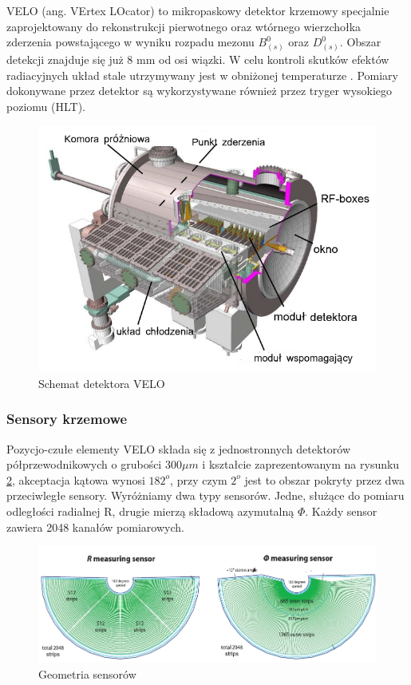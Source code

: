 VELO (ang. VErtex LOcator) to mikropaskowy detektor krzemowy specjalnie zaprojektowany do rekonstrukcji pierwotnego oraz wtórnego wierzchołka zderzenia powstającego w wyniku rozpadu mezonu $B_{(s)}^0$ oraz $D_{(s)}^0$\cite{VELORaport}. Obszar detekcji znajduje się już 8 mm od osi wiązki. W celu kontroli skutków efektów radiacyjnych układ stale utrzymywany jest w obniżonej temperaturze \cite{Papadelis} . Pomiary dokonywane przez detektor są wykorzystywane również przez tryger wysokiego poziomu (HLT). 
\begin{figure}[!ht]
 \centering
 \includegraphics[scale=0.7]{rozdzial2/Velo_jakis.png}
 \caption{Schemat detektora VELO\cite{VELORaport}}
 \label{fig:SchematVELO}
\end{figure}
\subsubsection{Sensory krzemowe }
Pozycjo-czułe elementy VELO składa się z jednostronnych detektorów półprzewodnikowych o grubości 300$\mu m$ i  kształcie zaprezentowanym na rysunku \ref{fig:sensory}, akceptacja kątowa wynosi $182^{o}$, przy czym $2^{o}$ jest to obszar pokryty przez dwa przeciwległe sensory. Wyróżniamy dwa typy sensorów. Jedne, służące do pomiaru odległości radialnej R, drugie mierzą składową azymutalną $\Phi$. Każdy sensor zawiera 2048 kanałów pomiarowych. 
\begin{figure}[ht!]
 \centering
 \includegraphics[scale=0.6]{rozdzial2/sensory.jpeg}
 \caption{Geometria sensorów \cite{VELORaport}}
 \label{fig:sensory}
\end{figure}


